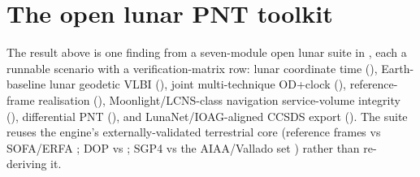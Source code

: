 \section{The open lunar PNT toolkit}

The result above is one finding from a seven-module open lunar suite in
 \citep{baweja2026kshana}, each a runnable scenario with a
verification-matrix row: lunar coordinate time (),
Earth-baseline lunar geodetic VLBI (), joint multi-technique
OD+clock (), reference-frame realisation
(), Moonlight/LCNS-class navigation service-volume
integrity (), differential PNT (), and
LunaNet/IOAG-aligned CCSDS export (). The suite reuses the
engine's externally-validated terrestrial core (reference frames vs SOFA/ERFA
\citep{iausofa}; DOP vs  \citep{knowles2024gnsslibpy}; SGP4
vs the AIAA/Vallado set \citep{vallado2006}) rather than re-deriving it.
